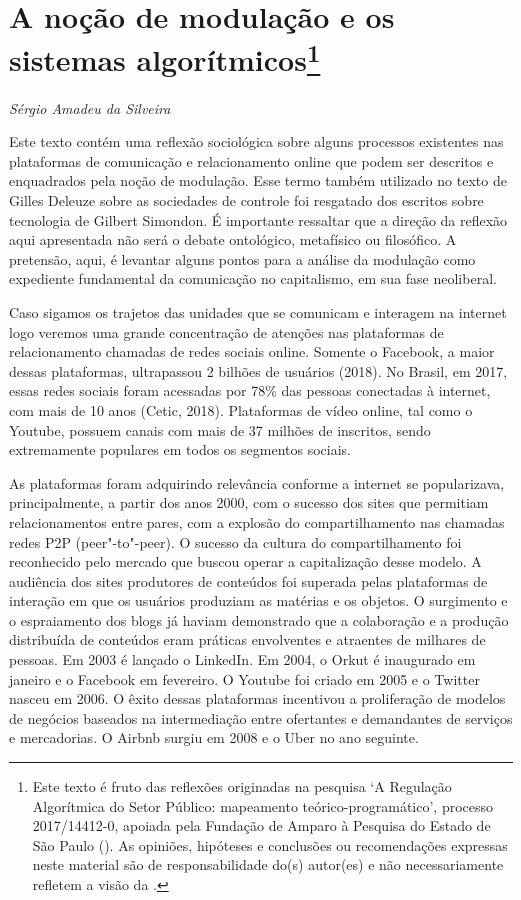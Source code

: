 \chapter{A noção de modulação e os sistemas algorítmicos\footnote{Este texto é fruto das reflexões originadas na pesquisa `A Regulação Algorítmica do Setor Público: mapeamento teórico-programático', processo 2017/14412-0, apoiada pela Fundação de Amparo à Pesquisa do Estado de São Paulo (). As opiniões, hipóteses e conclusões ou recomendações expressas neste material são de responsabilidade do(s) autor(es) e não necessariamente refletem a visão da .}}

\begin{flushright}
\emph{Sérgio Amadeu da Silveira}
\end{flushright}

Este texto contém uma reflexão sociológica sobre alguns processos
existentes nas plataformas de comunicação e relacionamento online que
podem ser descritos e enquadrados pela noção de modulação. Esse termo
também utilizado no texto de Gilles Deleuze sobre as sociedades de
controle foi resgatado dos escritos sobre tecnologia de Gilbert
Simondon. É importante ressaltar que a direção da reflexão aqui
apresentada não será o debate ontológico, metafísico ou filosófico. A
pretensão, aqui, é levantar alguns pontos para a análise da modulação
como expediente fundamental da comunicação no capitalismo, em sua fase
neoliberal.

Caso sigamos os trajetos das unidades que se comunicam e interagem na
internet logo veremos uma grande concentração de atenções nas
plataformas de relacionamento chamadas de redes sociais online. Somente
o Facebook, a maior dessas plataformas, ultrapassou 2 bilhões de
usuários (2018). No Brasil, em 2017, essas redes sociais foram acessadas
por 78\% das pessoas conectadas à internet, com mais de 10 anos (Cetic,
2018). Plataformas de vídeo online, tal como o Youtube, possuem canais
com mais de 37 milhões de inscritos, sendo extremamente populares em
todos os segmentos sociais.

As plataformas foram adquirindo relevância conforme a internet se
popularizava, principalmente, a partir dos anos 2000, com o sucesso dos
sites que permitiam relacionamentos entre pares, com a explosão do
compartilhamento nas chamadas redes P2P (peer"-to"-peer). O sucesso da
cultura do compartilhamento foi reconhecido pelo mercado que buscou
operar a capitalização desse modelo. A audiência dos sites produtores de
conteúdos foi superada pelas plataformas de interação em que os usuários
produziam as matérias e os objetos. O surgimento e o espraiamento dos
blogs já haviam demonstrado que a colaboração e a produção distribuída
de conteúdos eram práticas envolventes e atraentes de milhares de
pessoas. Em 2003 é lançado o LinkedIn. Em 2004, o Orkut é inaugurado em
janeiro e o Facebook em fevereiro. O Youtube foi criado em 2005 e o
Twitter nasceu em 2006. O êxito dessas plataformas incentivou a
proliferação de modelos de negócios baseados na intermediação entre
ofertantes e demandantes de serviços e mercadorias. O Airbnb surgiu em
2008 e o Uber no ano seguinte.

